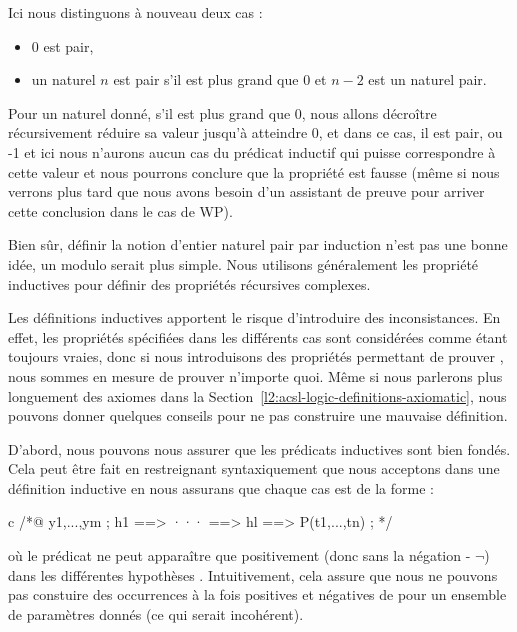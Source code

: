 

Ici nous distinguons à nouveau deux cas :

\begin{itemize}
\item 0 est pair,
\item un naturel $n$ est pair s'il est plus grand que $0$ et $n-2$ est un
      naturel pair.
\end{itemize}


Pour un naturel donné, s'il est plus grand que 0, nous allons décroître
récursivement réduire sa valeur jusqu'à atteindre 0, et dans ce cas, il est pair,
ou -1 et ici nous n'aurons aucun cas du prédicat inductif qui puisse correspondre
à cette valeur et nous pourrons conclure que la propriété est fausse (même si
nous verrons plus tard que nous avons besoin d'un assistant de preuve pour
arriver cette conclusion dans le cas de WP).





Bien sûr, définir la notion d'entier naturel pair par induction n'est pas une
bonne idée, un modulo serait plus simple. Nous utilisons généralement les
propriété inductives pour définir des propriétés récursives complexes.




Les définitions inductives apportent le risque d'introduire des inconsistances.
En effet, les propriétés spécifiées dans les différents cas sont considérées
comme étant toujours vraies, donc si nous introduisons des propriétés permettant
de prouver , nous sommes en mesure de prouver n'importe quoi.
Même si nous parlerons plus longuement des axiomes dans la
Section~\ref{l2:acsl-logic-definitions-axiomatic}, nous pouvons donner quelques
conseils pour ne pas construire une mauvaise définition.


D'abord, nous pouvons nous assurer que les prédicats inductives sont bien fondés.
Cela peut être fait en restreignant syntaxiquement que nous acceptons dans une
définition inductive en nous assurans que chaque cas est de la forme :

\begin{CodeBlock}{c}
/*@
  \forall y1,...,ym ; h1 ==> ··· ==> hl ==> P(t1,...,tn) ;
*/
\end{CodeBlock}


où le prédicat  ne peut apparaître que positivement (donc sans la
négation \CodeInline{!} - $\neg$) dans les différentes hypothèses .
Intuitivement, cela assure que nous ne pouvons pas constuire des occurrences à la
fois positives et négatives de  pour un ensemble de paramètres donnés
(ce qui serait incohérent).



